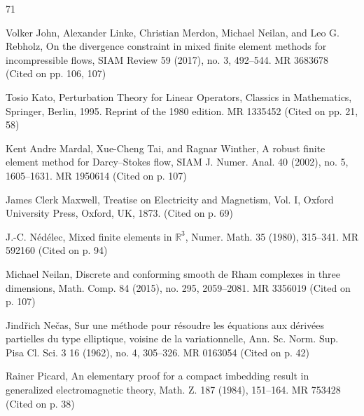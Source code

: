 \begin{MBSourceBibliography}{71}
\item\label{bib:source-55}Volker John, Alexander Linke, Christian Merdon, Michael Neilan, and Leo G. Rebholz, On the divergence constraint in mixed finite element methods for incompressible flows, SIAM Review 59 (2017), no. 3, 492–544. MR 3683678 (Cited on pp. 106, 107)

\item\label{bib:source-56}Tosio Kato, Perturbation Theory for Linear Operators, \newline Classics in Mathematics, Springer, Berlin, 1995. Reprint of the 1980 edition. MR 1335452 (Cited on pp. 21, 58)

\item\label{bib:source-57}Kent Andre Mardal, Xue-Cheng Tai, and Ragnar Winther, A robust finite element method for Darcy–Stokes flow, SIAM J. Numer. Anal. 40 (2002), no. 5, 1605–1631. MR 1950614 (Cited on p. 107)

\item\label{bib:source-58}James Clerk Maxwell, Treatise on Electricity and Magnetism, Vol. I, Oxford University Press, Oxford, UK, 1873. (Cited on p. 69)

\item\label{bib:source-59}J.-C. Nédélec, Mixed finite elements in $\mathbb R^3$, Numer. Math. 35 (1980), 315–341. MR 592160 (Cited on p. 94)

\item\label{bib:source-60}Michael Neilan, Discrete and conforming smooth de Rham complexes in three dimensions, Math. Comp. 84 (2015), no. 295, 2059–2081. MR 3356019 (Cited on p. 107)

\item\label{bib:source-61}Jindřich Nečas, Sur une méthode pour résoudre les équations aux dérivées partielles du type elliptique, voisine de la variationnelle, Ann. Sc. Norm. Sup. Pisa Cl. Sci. 3 16 (1962), no. 4, 305–326. MR 0163054 (Cited on p. 42)

\item\label{bib:source-62}Rainer Picard, An elementary proof for a compact imbedding result in generalized electromagnetic theory, Math. Z. 187 (1984), 151–164. MR 753428 (Cited on p. 38)


\end{MBSourceBibliography}
